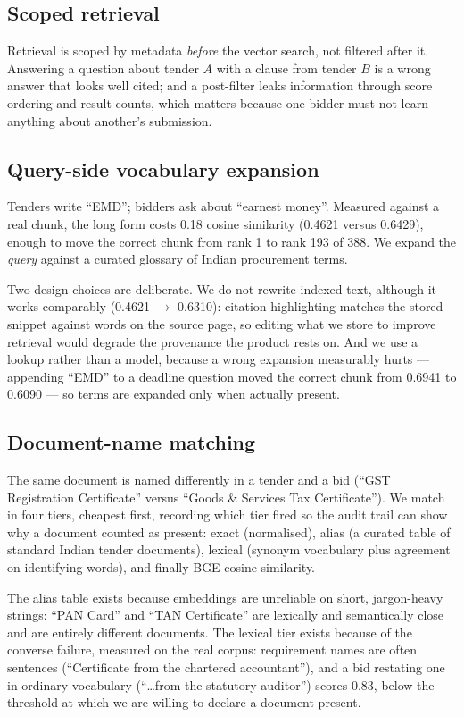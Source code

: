 \documentclass[conference]{IEEEtran}
\begin{document}
\subsection{Scoped retrieval}

Retrieval is scoped by metadata \emph{before} the vector search, not filtered
after it. Answering a question about tender $A$ with a clause from tender $B$ is
a wrong answer that looks well cited; and a post-filter leaks information
through score ordering and result counts, which matters because one bidder must
not learn anything about another's submission.

\subsection{Query-side vocabulary expansion}

Tenders write ``EMD''; bidders ask about ``earnest money''. Measured against a
real chunk, the long form costs 0.18 cosine similarity (0.4621 versus 0.6429),
enough to move the correct chunk from rank 1 to rank 193 of 388. We expand the
\emph{query} against a curated glossary of Indian procurement terms.

Two design choices are deliberate. We do not rewrite indexed text, although it
works comparably (0.4621 $\to$ 0.6310): citation highlighting matches the stored
snippet against words on the source page, so editing what we store to improve
retrieval would degrade the provenance the product rests on. And we use a
lookup rather than a model, because a wrong expansion measurably hurts ---
appending ``EMD'' to a deadline question moved the correct chunk from 0.6941 to
0.6090 --- so terms are expanded only when actually present.

\subsection{Document-name matching}

The same document is named differently in a tender and a bid (``GST
Registration Certificate'' versus ``Goods \& Services Tax Certificate''). We
match in four tiers, cheapest first, recording which tier fired so the audit
trail can show why a document counted as present: exact (normalised), alias (a
curated table of standard Indian tender documents), lexical (synonym vocabulary
plus agreement on identifying words), and finally BGE cosine similarity.

The alias table exists because embeddings are unreliable on short, jargon-heavy
strings: ``PAN Card'' and ``TAN Certificate'' are lexically and semantically
close and are entirely different documents. The lexical tier exists because of
the converse failure, measured on the real corpus: requirement names are often
sentences (``Certificate from the chartered accountant''), and a bid restating
one in ordinary vocabulary (``\dots from the statutory auditor'') scores 0.83,
below the threshold at which we are willing to declare a document present.
\end{document}
